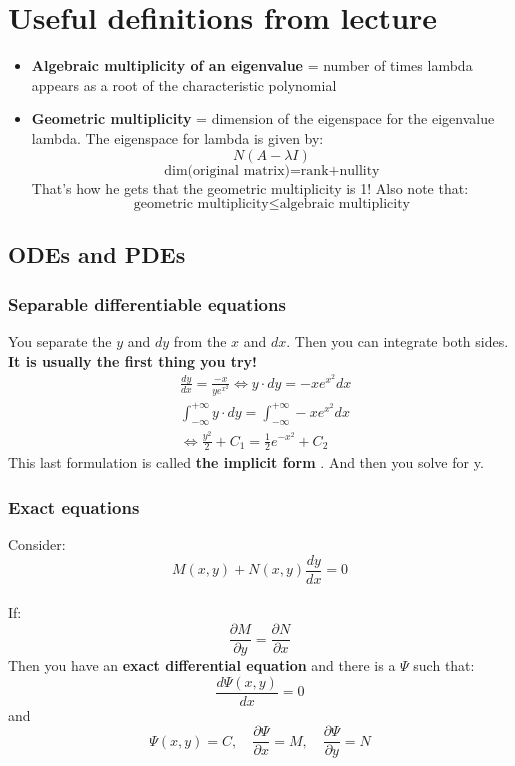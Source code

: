 \section{Useful definitions from lecture}
\begin{itemize}
    \item \textbf{Algebraic multiplicity of an eigenvalue} = number of times lambda appears as a root of the characteristic polynomial
    \item \textbf{Geometric multiplicity} = dimension of the eigenspace for the eigenvalue lambda. The eigenspace for lambda is given by:
    $$N(A-\lambda I)$$
    $$\text{dim(original matrix)=rank+nullity}$$
    That's how he gets that the geometric multiplicity is 1! Also note that:
    $$\text{geometric multiplicity}\leq \text{algebraic multiplicity}$$
\end{itemize}

\subsection{ODEs and PDEs}
\subsubsection{Separable differentiable equations}
You separate the $y$ and $dy$ from the $x$ and $dx$. Then you can integrate both sides. \textbf{It is usually the first thing you try!}
\begin{align*}
    &\frac{dy}{dx} = \frac{-x}{ye^{x^2}}
    \iff y\cdot dy=-xe^{x^2}dx\\
    & \int_{-\infty}^{+\infty} y\cdot dy = \int_{-\infty}^{+\infty}-xe^{x^2}dx \\
    & \iff \frac{y^2}{2} + C_1 = \frac{1}{2}e^{-x^2}+C_2
\end{align*}
This last formulation is called \textbf{the implicit form}  . And then you solve for y.

\subsubsection{Exact equations}
Consider: $$M(x,y) + N(x,y)\frac{dy}{dx} = 0$$\\
If: $$\frac{\partial M}{\partial y} = \frac{\partial N}{\partial x}$$
Then you have an \textbf{exact differential equation} and there is a $\Psi$ such that:
$$\frac{d\Psi(x,y)}{dx}=0$$
and 
$$\Psi(x,y)=C, \quad \frac{\partial \Psi}{\partial x}=M, \quad
\frac{\partial \Psi}{\partial y}=N$$

